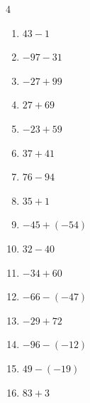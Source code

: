 \begin{multicols}{4}
\begin{enumerate}
  \item $43-1$

        \phantom{$=42$}

  \item $-97-31$

        \phantom{$=-128$}

  \item $-27+99$

        \phantom{$=72$}

  \item $27+69$

        \phantom{$=96$}

  \item $-23+59$

        \phantom{$=36$}

  \item $37+41$

        \phantom{$=78$}

  \item $76-94$

        \phantom{$=-18$}

\columnbreak %

  \item $35+1$

        \phantom{$=36$}

  \item $-45+(-54)$

        \phantom{$=-99$}

  \item $32-40$

        \phantom{$=-8$}

  \item $-34+60$

        \phantom{$=26$}

  \item $-66-(-47)$

        \phantom{$=-19$}

  \item $-29+72$

        \phantom{$=43$}

  \item $-96-(-12)$

        \phantom{$=-84$}

  \item $49-(-19)$

        \phantom{$=68$}

  \item $83+3$


\end{enumerate}
\end{multicols}
